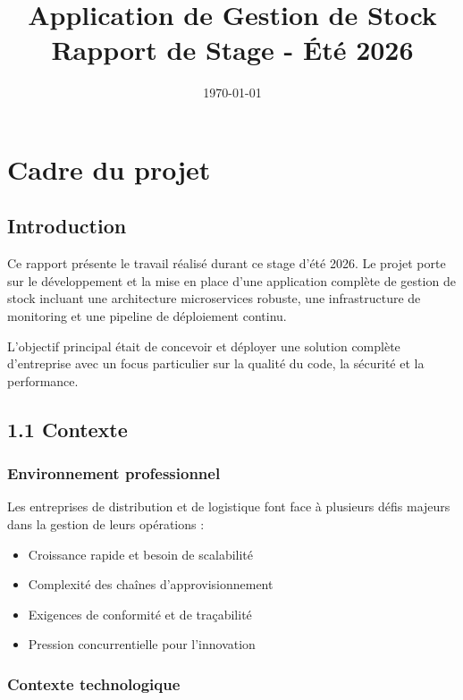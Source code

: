 \documentclass[12pt,a4paper]{report}
\title{Application de Gestion de Stock\\Rapport de Stage - Été 2026}
\author{}
\date{\today}
\begin{document}
\maketitle
\newpage
\tableofcontents
\newpage

\chapter{Cadre du projet}

\section{Introduction}

Ce rapport présente le travail réalisé durant ce stage d'été 2026. Le projet porte sur le développement et la mise en place d'une application complète de gestion de stock incluant une architecture microservices robuste, une infrastructure de monitoring et une pipeline de déploiement continu.

L'objectif principal était de concevoir et déployer une solution complète d'entreprise avec un focus particulier sur la qualité du code, la sécurité et la performance.

\section{1.1 Contexte}

\subsection{Environnement professionnel}

Les entreprises de distribution et de logistique font face à plusieurs défis majeurs dans la gestion de leurs opérations :

\begin{itemize}
    \item Croissance rapide et besoin de scalabilité
    \item Complexité des chaînes d'approvisionnement
    \item Exigences de conformité et de traçabilité
    \item Pression concurrentielle pour l'innovation
\end{itemize}

\subsection{Contexte technologique}
\end{document}

